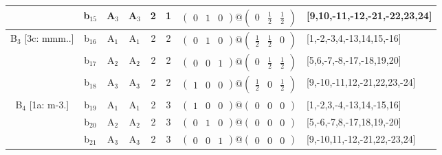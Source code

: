 \documentclass[fleqn,10pt,landscape]{article}
\begin{document}
\begin{itemize}
\begin{center}
\begin{longtable}{cc|cc|c|c|c|l}
& b$_{15}$ & A$_{3}$ & A$_{3}$ & 2 & 1 & $\begin{pmatrix} 0 & 1 & 0 \end{pmatrix}@\begin{pmatrix} 0 & \frac{1}{2} & \frac{1}{2} \end{pmatrix}$ & [9,10,-11,-12,-21,-22,23,24] \\ \hline
B$_{3}$ [3c: mmm..] & b$_{16}$ & A$_{1}$ & A$_{1}$ & 2 & 2 & $\begin{pmatrix} 0 & 1 & 0 \end{pmatrix}@\begin{pmatrix} \frac{1}{2} & \frac{1}{2} & 0 \end{pmatrix}$ & [1,-2,-3,4,-13,14,15,-16] \\
& b$_{17}$ & A$_{2}$ & A$_{2}$ & 2 & 2 & $\begin{pmatrix} 0 & 0 & 1 \end{pmatrix}@\begin{pmatrix} 0 & \frac{1}{2} & \frac{1}{2} \end{pmatrix}$ & [5,6,-7,-8,-17,-18,19,20] \\
& b$_{18}$ & A$_{3}$ & A$_{3}$ & 2 & 2 & $\begin{pmatrix} 1 & 0 & 0 \end{pmatrix}@\begin{pmatrix} \frac{1}{2} & 0 & \frac{1}{2} \end{pmatrix}$ & [9,-10,-11,12,-21,22,23,-24] \\ \hline
B$_{4}$ [1a: m-3.] & b$_{19}$ & A$_{1}$ & A$_{1}$ & 2 & 3 & $\begin{pmatrix} 1 & 0 & 0 \end{pmatrix}@\begin{pmatrix} 0 & 0 & 0 \end{pmatrix}$ & [1,-2,3,-4,-13,14,-15,16] \\
& b$_{20}$ & A$_{2}$ & A$_{2}$ & 2 & 3 & $\begin{pmatrix} 0 & 1 & 0 \end{pmatrix}@\begin{pmatrix} 0 & 0 & 0 \end{pmatrix}$ & [5,-6,-7,8,-17,18,19,-20] \\
& b$_{21}$ & A$_{3}$ & A$_{3}$ & 2 & 3 & $\begin{pmatrix} 0 & 0 & 1 \end{pmatrix}@\begin{pmatrix} 0 & 0 & 0 \end{pmatrix}$ & [9,-10,11,-12,-21,22,-23,24] \\
\end{longtable}
\end{center}


\end{itemize}
\end{document}

